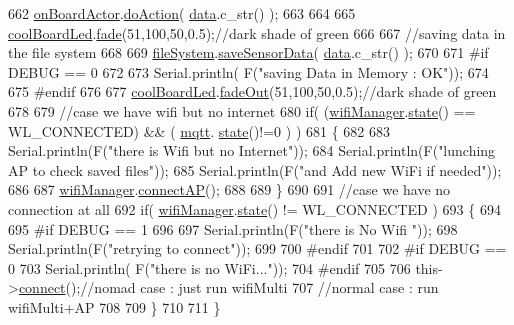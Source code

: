 \begin{DoxyCode}
662     \hyperlink{class_cool_board_a4ac693895c21025b8808653f2a4316e6}{onBoardActor}.\hyperlink{class_cool_board_actor_a96a45658d32c6b95caa2f385c7da32cd}{doAction}( \hyperlink{class_cool_board_a427fb753dd8575bdf821c70a5c63d695}{data}.c\_str() );  
663 
664 
665     \hyperlink{class_cool_board_a1b1d3c684a5baa56b08486e192fd8e97}{coolBoardLed}.\hyperlink{class_cool_board_led_af1cacbaa88db8bcf6042c1083ba41155}{fade}(51,100,50,0.5);\textcolor{comment}{//dark shade of green  }
666     
667     \textcolor{comment}{//saving data in the file system}
668     
669     \hyperlink{class_cool_board_a42c2586fbb13ff7f06538e9284e8538d}{fileSystem}.\hyperlink{class_cool_file_system_afa3a4feae94871d4d3b6bebb701c2e67}{saveSensorData}( \hyperlink{class_cool_board_a427fb753dd8575bdf821c70a5c63d695}{data}.c\_str() );
670 
671 \textcolor{preprocessor}{    #if DEBUG == 0}
672 
673         Serial.println( F(\textcolor{stringliteral}{"saving Data in Memory : OK"}));
674 
675 \textcolor{preprocessor}{    #endif}
676 
677     \hyperlink{class_cool_board_a1b1d3c684a5baa56b08486e192fd8e97}{coolBoardLed}.\hyperlink{class_cool_board_led_a93d545679237e8cc858324367149775c}{fadeOut}(51,100,50,0.5);\textcolor{comment}{//dark shade of green}
678 
679     \textcolor{comment}{//case we have wifi but no internet}
680     \textcolor{keywordflow}{if}( (\hyperlink{class_cool_board_acd88e6003606b47479ebba81e4aceeca}{wifiManager}.\hyperlink{class_cool_wifi_a1c7b4d82a4098d346e7593dce92039fa}{state}() == WL\_CONNECTED) && ( \hyperlink{class_cool_board_a2399f44d7c23c1149a335cb3b46d90f1}{mqtt}.
      \hyperlink{class_cool_m_q_t_t_a5d003307eff78efbd585e42b43b72b6d}{state}()!=0 ) )
681     \{
682         
683         Serial.println(F(\textcolor{stringliteral}{"there is Wifi but no Internet"}));
684         Serial.println(F(\textcolor{stringliteral}{"lunching AP to check saved files"}));
685         Serial.println(F(\textcolor{stringliteral}{"and Add new WiFi if needed"}));
686         
687         \hyperlink{class_cool_board_acd88e6003606b47479ebba81e4aceeca}{wifiManager}.\hyperlink{class_cool_wifi_a7c857f27161782f5ef1d62d552aff971}{connectAP}();
688         
689     \}
690     
691     \textcolor{comment}{//case we have no connection at all}
692     \textcolor{keywordflow}{if}( \hyperlink{class_cool_board_acd88e6003606b47479ebba81e4aceeca}{wifiManager}.\hyperlink{class_cool_wifi_a1c7b4d82a4098d346e7593dce92039fa}{state}() != WL\_CONNECTED )
693     \{
694     
695 \textcolor{preprocessor}{    #if DEBUG == 1}
696         
697         Serial.println(F(\textcolor{stringliteral}{"there is No Wifi "}));
698         Serial.println(F(\textcolor{stringliteral}{"retrying to connect"}));
699     
700 \textcolor{preprocessor}{    #endif}
701 
702 \textcolor{preprocessor}{    #if DEBUG == 0}
703         Serial.println( F(\textcolor{stringliteral}{"there is no WiFi..."}));
704 \textcolor{preprocessor}{    #endif}
705         
706         this->\hyperlink{class_cool_board_a519de78b807f8ec6463ff484eb925918}{connect}();\textcolor{comment}{//nomad case : just run wifiMulti}
707                 \textcolor{comment}{//normal case : run wifiMulti+AP}
708         
709     \}   
710 
711 \}
\end{DoxyCode}
